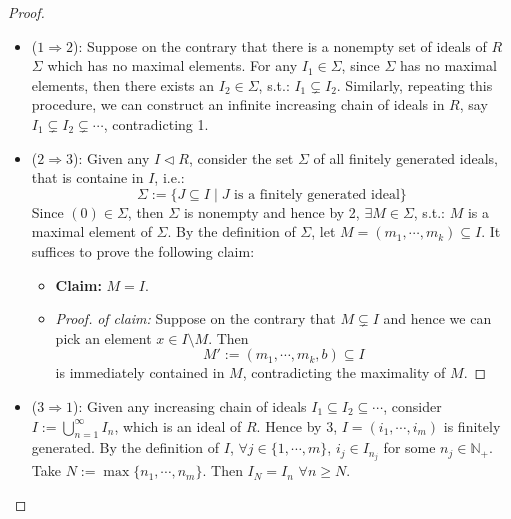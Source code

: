 \begin{proof}
    \begin{itemize}
        \item ($1 \Rightarrow 2$): Suppose on the contrary that there is a nonempty set of ideals of $R$ $\Sigma$ which has no maximal elements. For any $I_1 \in \Sigma$, since $\Sigma$ has no maximal elements, then there exists an $I_2 \in \Sigma$, s.t.: $I_1 \subsetneq I_2$. Similarly, repeating this procedure, we can construct an infinite increasing chain of ideals in $R$, say $I_1 \subsetneq I_2 \subsetneq \cdots$, contradicting 1.

        \item ($2 \Rightarrow 3$): Given any $I \triangleleft R$, consider the set $\Sigma$ of all finitely generated ideals, that is containe in $I$, i.e.:
        $$\Sigma:= \{J \subseteq I \mid J \text{ is a finitely generated ideal} \}$$
        Since $(0) \in \Sigma$, then $\Sigma$ is nonempty and hence by 2, $\exists M\in \Sigma$, s.t.: $M$ is a maximal element of $\Sigma$. By the definition of $\Sigma$, let $M =(m_1 ,\cdots, m_k) \subseteq I$. It suffices to prove the following claim:

        \begin{itemize}
            \item \textbf{Claim:} $M=I$.

            \item \begin{proof}
                \textit{of claim:} Suppose on the contrary that $M \subsetneq I$ and hence we can pick an element $x \in I \setminus M$. Then
                $$M' := (m_1,\cdots,m_k ,b) \subseteq I$$
                is immediately contained in $M$, contradicting the maximality of $M$.
            \end{proof}
        \end{itemize}

        \item ($3 \Rightarrow 1$): Given any increasing chain of ideals $I_1 \subseteq I_2 \subseteq \cdots$, consider $I:= \bigcup_{n=1}^\infty I_n$, which is an ideal of $R$. Hence by 3, $I= (i_1 ,\cdots, i_m)$ is finitely generated. By the definition of $I$, $\forall j \in \{1,\cdots, m\}$, $i_j \in I_{n_j}$ for some $n_j \in \mathbb{N}_+$. Take $N:= \max \{ n_1 ,\cdots, n_m\}$. Then $I_N = I_n$ $\forall n \geq N$.
    \end{itemize}
\end{proof}

